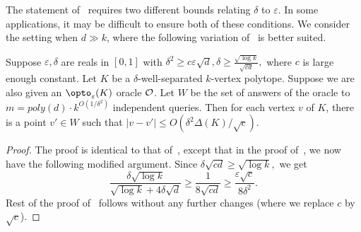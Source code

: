 The statement of~ requires two different bounds relating $\delta$ to $\varepsilon$. In some applications, it may be difficult to ensure both of these conditions. We consider the setting when $d \gg k$, where the following variation of~ is better suited. 

\begin{theorem}\label{upper-bound-2}
Suppose $\varepsilon,\delta$ are reals in $[0,1]$ with $\delta^2\geq c\varepsilon\sqrt d, \delta \geq \frac{ \sqrt{\log k}}{\sqrt{cd}},$ where $c$ is  large enough constant.  Let $K$ be a $\delta$-well-separated $k$-vertex polytope. Suppose we are also given an  $\opto_\varepsilon(K)$ oracle $\cal O$.
Let $W$ be the set of answers of the oracle to $m=poly(d)\cdot k^{O(1/\delta^2)}$ independent queries.  Then for each vertex $v$ of $K$, there is a point $v' \in W$ such that $|v-v'| \leq O(\delta^2 \Delta(K)/\sqrt{c}).$
\end{theorem}
\begin{proof}
    The proof is identical to that of~, except that in the proof of~, we now have the following modified argument. Since $\delta \sqrt{cd} \geq \sqrt{\log k}, $ we get 
     $$\frac{\delta \sqrt{\log k}}{\sqrt{\log k} + 4 \delta \sqrt{d}}  \geq \frac{1}{8 \sqrt{cd}} \geq \frac{\varepsilon \sqrt{c}}{8 \delta^2}. $$
     Rest of the proof of~ follows without any further changes (where we replace $c$ by $\sqrt{c}$). 
\end{proof}
